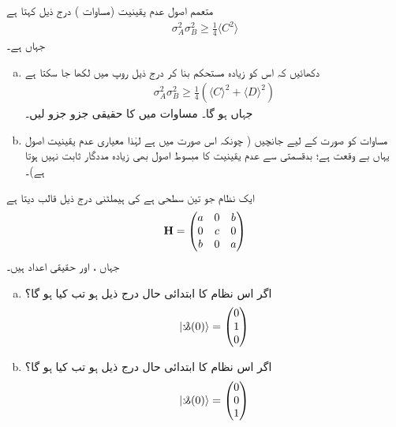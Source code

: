 \quad متعمم اصول عدم یقینیت (مساوات ) درج ذیل کہتا ہے
 \begin{align*} 
\sigma_{A}^{2}\sigma_{B}^{2}\geq\frac{1}{4}\langle C^{2} \rangle 
 \end{align*} 
جہاں  ہے۔
\begin{enumerate}[a.] 
\item
دکھائیں  کہ اس کو زیادہ مستحکم بنا کر درج ذیل روپ میں لکھا جا سکتا ہے
 \begin{align}\label{مساوات_سوال_مستحکم_عدم_یقینیت} 
\sigma_{A}^{2}\sigma_{B}^{2}\geq\frac{1}{4}(\langle C\rangle^{2}+\langle D \rangle ^{2}) 
 \end{align} 
جہاں  ہو گا۔  مساوات  میں  کا حقیقی جزو  جزو لیں۔ 
\item
مساوات  کو  صورت کے لیے جانچیں ( چونکہ اس صورت میں  ہے لہٰذا معیاری عدم یقینیت اصول یہاں بے وقعت ہے؛ بدقسمتی سے عدم یقینیت کا مبسوط اصول بھی زیادہ مددگار ثابت نہیں ہوتا ہے)۔ 
\end{enumerate}

ایک نظام جو تین سطحی ہے کی ہیملٹنی درج ذیل قالب دیتا ہے
 \begin{align*} 
\operatorname{\mathbf{H}}=\begin{pmatrix}
a&0&b\\
0&c&0\\
b&0&a
\end{pmatrix} 
 \end{align*} 
جہاں ،  اور  حقیقی اعداد ہیں۔
\begin{enumerate}[a.]
 \item
 اگر اس نظام کا ابتدائی حال درج ذیل ہو تب  کیا ہو گا؟ 
 \begin{align*} 
|\s(0) \rangle=\begin{pmatrix}
0\\
1\\
0
\end{pmatrix} 
 \end{align*} 
\item
 اگر اس نظام کا ابتدائی حال درج ذیل ہو تب  کیا ہو گا؟ 
 \begin{align*} 
| \s(0)\rangle =\begin{pmatrix}
0\\
0\\
1
\end{pmatrix} 
 \end{align*} 
\end{enumerate}

